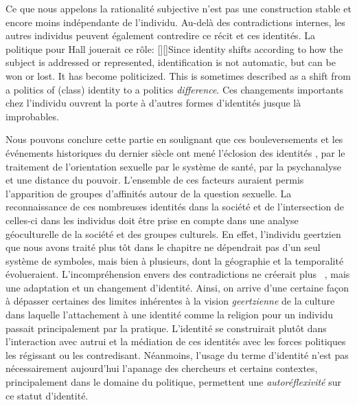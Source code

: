 Ce que nous appelons la rationalité subjective n'est pas une construction stable et encore moins indépendante de l'individu.
Au-delà des contradictions internes, les autres individus peuvent également contredire ce récit et ces identités.
La politique pour Hall jouerait ce rôle: [{\citeyear[610]{Hall1996a}}][]{Since identity shifts according to how the subject is addressed or represented, identification is not automatic, but can be won or lost. It has become politicized. This is sometimes described as a shift from a politics of (class) identity to a politics \emph{difference}}.
Ces changements importants chez l'individu ouvrent la porte à d'autres formes d'identités jusque là improbables.

Nous pouvons conclure cette partie en soulignant que ces bouleversements et les événements historiques du dernier siècle ont mené l'éclosion des identités \lgbt{}, par le traitement de l'orientation sexuelle par le système de santé, par la psychanalyse et une distance du pouvoir.
L'ensemble de ces facteurs auraient permis l'apparition de groupes d'affinités autour de la question sexuelle. 
La reconnaissance de ces nombreuses identités dans la société et de l'intersection de celles-ci dans les individus doit être prise en compte dans une analyse géoculturelle de la société et des groupes culturels.
En effet, l'individu geertzien que nous avons traité plus tôt dans le chapitre ne  dépendrait pas d'un seul système de symboles, mais bien à plusieurs, dont la géographie et la temporalité évolueraient.
L'incompréhension envers des contradictions ne créerait plus ~\citep[33]{Geertz1972}, mais une adaptation et un changement d'identité.
Ainsi, on arrive d'une certaine façon à dépasser certaines des limites inhérentes à la vision \emph{geertzienne} de la culture dans laquelle l'attachement à une identité comme la religion pour un individu passait principalement par la pratique.
L'identité se construirait plutôt dans l'interaction avec autrui et la médiation de ces identités avec les forces politiques les régissant ou les contredisant.
Néanmoins, l'usage du terme d'identité n'est pas nécessairement aujourd'hui l'apanage des chercheurs et certains contextes, principalement dans le domaine du politique, permettent une \emph{autoréflexivité} sur ce statut d'identité.

